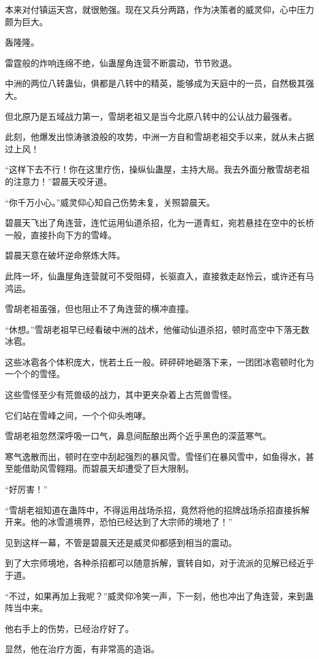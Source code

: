 \begin{this_body}
本来对付镇运天宫，就很勉强。现在又兵分两路，作为决策者的威灵仰，心中压力颇为巨大。

轰隆隆。

雷霆般的炸响连绵不绝，仙蛊屋角连营不断震动，节节败退。

中洲的两位八转蛊仙，俱都是八转中的精英，能够成为天庭中的一员，自然极其强大。

但北原乃是五域战力第一，雪胡老祖又是当今北原八转中的公认战力最强者。

此刻，他爆发出惊涛骇浪般的攻势，中洲一方自和雪胡老祖交手以来，就从未占据过上风！

“这样下去不行！你在这里疗伤，操纵仙蛊屋，主持大局。我去外面分散雪胡老祖的注意力！”碧晨天咬牙道。

“你千万小心。”威灵仰心知自己伤势未复，关照碧晨天。

碧晨天飞出了角连营，连忙运用仙道杀招，化为一道青虹，宛若悬挂在空中的长桥一般，直接扑向下方的雪峰。

碧晨天意在破坏逆命祭炼大阵。

此阵一坏，仙蛊屋角连营就可不受阻碍，长驱直入，直接救走赵怜云，或许还有马鸿运。

雪胡老祖虽强，但也阻止不了角连营的横冲直撞。

“休想。”雪胡老祖早已经看破中洲的战术，他催动仙道杀招，顿时高空中下落无数冰雹。

这些冰雹各个体积庞大，恍若土丘一般。砰砰砰地砸落下来，一团团冰雹顿时化为一个个的雪怪。

这些雪怪至少有荒兽级的战力，其中更夹杂着上古荒兽雪怪。

它们站在雪峰之间，一个个仰头咆哮。

雪胡老祖忽然深呼吸一口气，鼻息间酝酿出两个近乎黑色的深蓝寒气。

寒气逸散而出，顿时在空中刮起强烈的暴风雪。雪怪们在暴风雪中，如鱼得水，甚至能借助风雪翱翔。而碧晨天却遭受了巨大限制。

“好厉害！”

“雪胡老祖知道在蛊阵中，不得运用战场杀招，竟然将他的招牌战场杀招直接拆解开来。他的冰雪道境界，恐怕已经达到了大宗师的境地了！”

见到这样一幕，不管是碧晨天还是威灵仰都感到相当的震动。

到了大宗师境地，各种杀招都可以随意拆解，寰转自如，对于流派的见解已经近乎于道。

“不过，如果再加上我呢？”威灵仰冷笑一声，下一刻，他也冲出了角连营，来到蛊阵当中来。

他右手上的伤势，已经治疗好了。

显然，他在治疗方面，有非常高的造诣。


\end{this_body}
